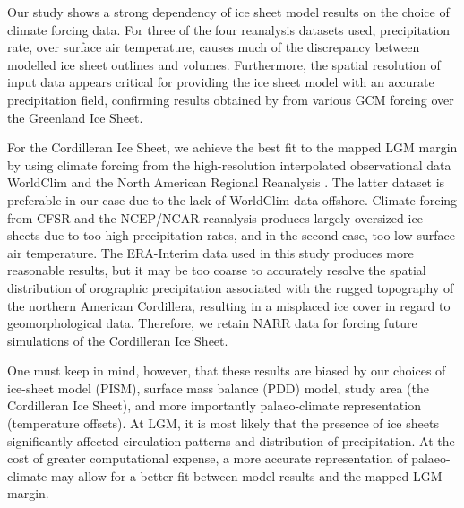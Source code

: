 \conclusions
\label{sec:concl}

Our study shows a strong dependency of ice sheet model results on the choice of climate forcing data. For three of the four reanalysis datasets used, precipitation rate, over surface air temperature, causes much of the discrepancy between modelled ice sheet outlines and volumes. Furthermore, the spatial resolution of input data appears critical for providing the ice sheet model with an accurate precipitation field, confirming results obtained by \citet{quiquet-etal-2012} from various GCM forcing over the Greenland Ice Sheet.

For the Cordilleran Ice Sheet, we achieve the best fit to the mapped LGM margin by \citet{dyke-2004} using climate forcing from the high-resolution interpolated observational data WorldClim \citep{data:worldclim} and the North American Regional Reanalysis \citep[NARR;][]{data:narr}. The latter dataset is preferable in our case due to the lack of WorldClim data offshore. Climate forcing from CFSR and the NCEP/NCAR reanalysis produces largely oversized ice sheets due to too high precipitation rates, and in the second case, too low surface air temperature. The ERA-Interim data used in this study produces more reasonable results, but it may be too coarse to accurately resolve the spatial distribution of orographic precipitation associated with the rugged topography of the northern American Cordillera, resulting in a misplaced ice cover in regard to geomorphological data. Therefore, we retain NARR data for forcing future simulations of the Cordilleran Ice Sheet.

One must keep in mind, however, that these results are biased by our choices of ice-sheet model (PISM), surface mass balance (PDD) model, study area (the Cordilleran Ice Sheet), and more importantly palaeo-climate representation (temperature offsets). At LGM, it is most likely that the presence of ice sheets significantly affected circulation patterns and distribution of precipitation. At the cost of greater computational expense, a more accurate representation of palaeo-climate may allow for a better fit between model results and the mapped LGM margin.
